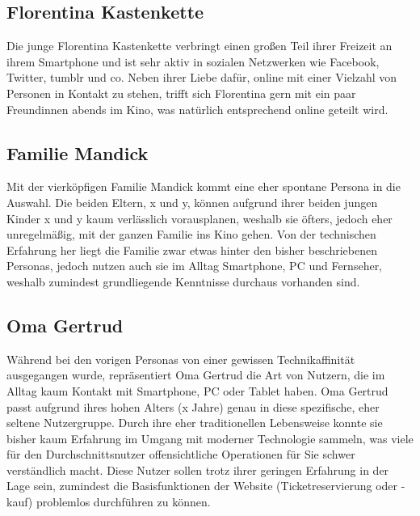 \subsection{Florentina Kastenkette}
Die junge Florentina Kastenkette verbringt einen großen Teil ihrer Freizeit an ihrem Smartphone und ist sehr aktiv in sozialen Netzwerken wie Facebook, Twitter, tumblr und co. Neben ihrer Liebe dafür, online mit einer Vielzahl von Personen in Kontakt zu stehen, trifft sich Florentina gern mit ein paar Freundinnen abends im Kino, was natürlich entsprechend online geteilt wird.

\subsection{Familie Mandick}
Mit der vierköpfigen Familie Mandick kommt eine eher spontane Persona in die Auswahl. Die beiden Eltern, x und y, können aufgrund ihrer beiden jungen Kinder x und y kaum verlässlich vorausplanen, weshalb sie öfters, jedoch eher unregelmäßig, mit der ganzen Familie ins Kino gehen. Von der technischen Erfahrung her liegt die Familie zwar etwas hinter den bisher beschriebenen Personas, jedoch nutzen auch sie im Alltag Smartphone, PC und Fernseher, weshalb zumindest grundliegende Kenntnisse durchaus vorhanden sind.

\subsection{Oma Gertrud}
Während bei den vorigen Personas von einer gewissen Technikaffinität ausgegangen wurde, repräsentiert Oma Gertrud die Art von Nutzern, die im Alltag kaum Kontakt mit Smartphone, PC oder Tablet haben.
Oma Gertrud passt aufgrund ihres hohen Alters (x Jahre) genau in diese spezifische, eher seltene Nutzergruppe. Durch ihre eher traditionellen Lebensweise konnte sie bisher kaum Erfahrung im Umgang mit moderner Technologie
sammeln, was viele für den Durchschnittsnutzer offensichtliche Operationen für Sie schwer verständlich macht.
Diese Nutzer sollen trotz ihrer geringen Erfahrung in der Lage sein, zumindest die Basisfunktionen der Website (Ticketreservierung oder -kauf) problemlos durchführen zu können.